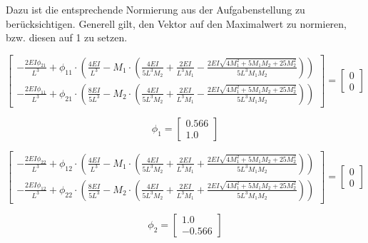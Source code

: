\documentclass[
  letterpaper,
  DIV=11]{scrreprt}
\begin{document}
Dazu ist die entsprechende Normierung aus der Aufgabenstellung zu
berücksichtigen. Generell gilt, den Vektor auf den Maximalwert zu
normieren, bzw. diesen auf 1 zu setzen.

\begin{equation}\left[\begin{matrix}- \frac{2 EI \phi_{21}}{L^{3}} + \phi_{11} \cdot \left(\frac{4 EI}{L^{3}} - M_{1} \cdot \left(\frac{4 EI}{5 L^{3} M_{2}} + \frac{2 EI}{L^{3} M_{1}} - \frac{2 EI \sqrt{4 M_{1}^{2} + 5 M_{1} M_{2} + 25 M_{2}^{2}}}{5 L^{3} M_{1} M_{2}}\right)\right)\\- \frac{2 EI \phi_{11}}{L^{3}} + \phi_{21} \cdot \left(\frac{8 EI}{5 L^{3}} - M_{2} \cdot \left(\frac{4 EI}{5 L^{3} M_{2}} + \frac{2 EI}{L^{3} M_{1}} - \frac{2 EI \sqrt{4 M_{1}^{2} + 5 M_{1} M_{2} + 25 M_{2}^{2}}}{5 L^{3} M_{1} M_{2}}\right)\right)\end{matrix}\right] = \left[\begin{matrix}0\\0\end{matrix}\right]\end{equation}

\begin{equation}\phi_{1} = \left[\begin{matrix}0.566\\1.0\end{matrix}\right]\end{equation}

\begin{equation}\left[\begin{matrix}- \frac{2 EI \phi_{22}}{L^{3}} + \phi_{12} \cdot \left(\frac{4 EI}{L^{3}} - M_{1} \cdot \left(\frac{4 EI}{5 L^{3} M_{2}} + \frac{2 EI}{L^{3} M_{1}} + \frac{2 EI \sqrt{4 M_{1}^{2} + 5 M_{1} M_{2} + 25 M_{2}^{2}}}{5 L^{3} M_{1} M_{2}}\right)\right)\\- \frac{2 EI \phi_{12}}{L^{3}} + \phi_{22} \cdot \left(\frac{8 EI}{5 L^{3}} - M_{2} \cdot \left(\frac{4 EI}{5 L^{3} M_{2}} + \frac{2 EI}{L^{3} M_{1}} + \frac{2 EI \sqrt{4 M_{1}^{2} + 5 M_{1} M_{2} + 25 M_{2}^{2}}}{5 L^{3} M_{1} M_{2}}\right)\right)\end{matrix}\right] = \left[\begin{matrix}0\\0\end{matrix}\right]\end{equation}

\begin{equation}\phi_{2} = \left[\begin{matrix}1.0\\-0.566\end{matrix}\right]\end{equation}
\end{document}

